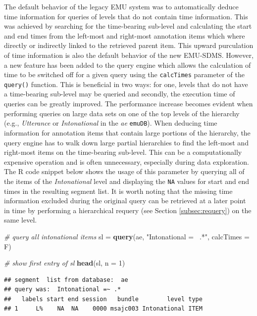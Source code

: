 \documentclass[]{book}
\newenvironment{Shaded}{\begin{snugshade}}{\end{snugshade}}
\newcommand{\CommentTok}[1]{\textcolor[rgb]{0.56,0.35,0.01}{\textit{#1}}}
\newcommand{\DataTypeTok}[1]{\textcolor[rgb]{0.13,0.29,0.53}{#1}}
\newcommand{\DecValTok}[1]{\textcolor[rgb]{0.00,0.00,0.81}{#1}}
\newcommand{\KeywordTok}[1]{\textcolor[rgb]{0.13,0.29,0.53}{\textbf{#1}}}
\newcommand{\NormalTok}[1]{#1}
\newcommand{\StringTok}[1]{\textcolor[rgb]{0.31,0.60,0.02}{#1}}
\begin{document}
The default behavior of the legacy EMU system was to automatically deduce time information for queries of levels that do not contain time information. This was achieved by searching for the time-bearing sub-level and calculating the start and end times from the left-most and right-most annotation items which where directly or indirectly linked to the retrieved parent item. This upward purculation of time information is also the default behavior of the new EMU-SDMS. However, a new feature has been added to the query engine which allows the calculation of time to be switched off for a given query using the \texttt{calcTimes} parameter of the \texttt{query()} function. This is beneficial in two ways: for one, levels that do not have a time-bearing sub-level may be queried and secondly, the execution time of queries can be greatly improved. The performance increase becomes evident when performing queries on large data sets on one of the top levels of the hierarchy (e.g., \emph{Utterance} or \emph{Intonational} in the \emph{ae} \texttt{emuDB}). When deducing time information for annotation items that contain large portions of the hierarchy, the query engine has to walk down large partial hierarchies to find the left-most and right-most items on the time-bearing sub-level. This can be a computationally expensive operation and is often unnecessary, especially during data exploration. The R code snippet below shows the usage of this parameter by querying all of the items of the \emph{Intonational} level and displaying the \texttt{NA} values for start and end times in the resulting segment list. It is worth noting that the missing time information excluded during the original query can be retrieved at a later point in time by performing a hierarchical requery (see Section \ref{subsec:requery}) on the same level.

\begin{Shaded}
\begin{Highlighting}[]
\CommentTok{# query all intonational items}
\NormalTok{sl =}\StringTok{ }\KeywordTok{query}\NormalTok{(ae, }\StringTok{"Intonational =~ .*"}\NormalTok{, }\DataTypeTok{calcTimes =}\NormalTok{ F)}

 \CommentTok{# show first entry of sl}
\KeywordTok{head}\NormalTok{(sl, }\DataTypeTok{n =} \DecValTok{1}\NormalTok{)}
\end{Highlighting}
\end{Shaded}

\begin{verbatim}
## segment  list from database:  ae 
## query was:  Intonational =~ .* 
##   labels start end session   bundle        level type
## 1     L%    NA  NA    0000 msajc003 Intonational ITEM
\end{verbatim}
\end{document}
